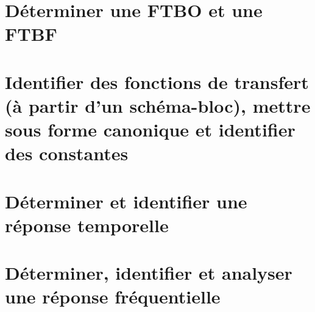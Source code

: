 \section{Déterminer une FTBO et une FTBF} 
\section{Identifier des fonctions de transfert (à partir d'un schéma-bloc), mettre sous forme canonique et identifier des constantes} 
\section{Déterminer et identifier une réponse temporelle} 
\section{Déterminer, identifier et analyser une réponse fréquentielle} 
\graphicspath{{\repStyle/png/}{../SLCI/SLCI-11-DiagrammeBode/510_01_Divers/images/}} 
 
 
\graphicspath{{\repStyle/png/}{../SLCI/SLCI-11-DiagrammeBode/510_02_Divers/images/}} 
 
 
\graphicspath{{\repStyle/png/}{../SLCI/SLCI-11-DiagrammeBode/510_03_Divers/images/}} 
 
 
\graphicspath{{\repStyle/png/}{../SLCI/SLCI-11-DiagrammeBode/511_Divers/images/}} 
 
 
